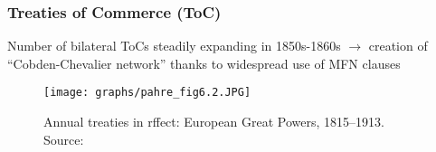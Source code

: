 \documentclass[10pt]{beamer}
\begin{document}
\begin{frame}
    \frametitle{Treaties of Commerce (ToC)}

    Number of bilateral ToCs steadily expanding in 1850s-1860s \citep{pahre2008} $\rightarrow$ creation of ``Cobden-Chevalier network'' thanks to widespread use of MFN clauses \citep{timini2023}
    
    \begin{figure}
        \centering
        \texttt{[image: graphs/pahre\_fig6.2.JPG]}
        \caption{Annual treaties in rffect: European Great Powers, 1815–1913. Source: \cite[][Fig. 6.2]{pahre2008}}
        \label{fig:treaties_pahre}
    \end{figure}

\end{frame}
\end{document}
